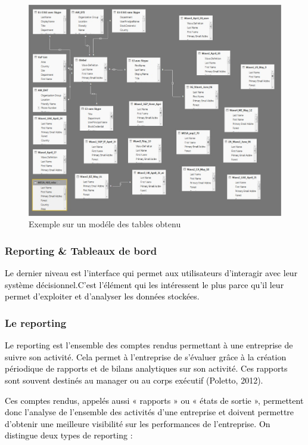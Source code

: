 \documentclass[a4paper,12pt]{report}
\begin{document}
\begin{figure}[H]
	\begin{center}
		\includegraphics[width=0.8\linewidth]{Projet_O365/modele}
\end{center}
	\caption{Exemple sur un modéle des tables obtenu}
	\label{fig:18}	
\end{figure}


\subsubsection{Reporting \& Tableaux de bord }

\textcolor{black}{Le dernier niveau est l’interface qui permet aux utilisateurs d’interagir avec leur système décisionnel.C’est l’élément qui les intéressent le plus parce qu’il leur permet d’exploiter et d’analyser les données
stockées.}

\subsubsection*{Le reporting }

\textcolor{black}{Le reporting est l’ensemble des comptes rendus permettant à une entreprise de suivre son activité.
Cela permet à l’entreprise de s’évaluer grâce à la création périodique de rapports et de bilans analytiques
sur son activité. Ces rapports sont souvent destinés au manager ou au corps exécutif (Poletto, 2012).}

\textcolor{black}{ Ces comptes rendus, appelés aussi « rapports » ou « états de sortie », permettent donc l’analyse de l’ensemble des activités d’une entreprise et doivent permettre d’obtenir une meilleure visibilité sur les performances de l’entreprise. On distingue deux types de reporting :}
\end{document}

